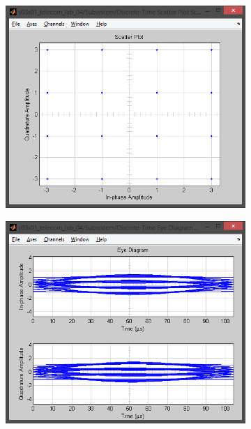 \documentclass[
	a4paper,
	oneside,
	BCOR = 10mm,
	DIV = 12,
	12pt,
	headings = normal,
]{scrartcl}
\begin{document}
\begin{figure}[!htbp]
\begin{subfigure}{\textwidth / 3}
						\caption{}
						\label{subfig:rolloff-0p8-signal-trajectory-in}
					\end{subfigure}%
					\begin{subfigure}{\textwidth / 3}
						\centering
						\includegraphics[height = 7\baselineskip]{../01-solution/rolloff-0p8-scatter-plot-in.png}
						\caption{}
						\label{subfig:rolloff-0p8-scatter-plot-in}
					\end{subfigure}
					\begin{subfigure}{\textwidth / 3}
						\centering
						\includegraphics[height = 7\baselineskip]{../01-solution/rolloff-0p8-eye-diag-out.png}

\end{subfigure}
\end{figure}
\end{document}
